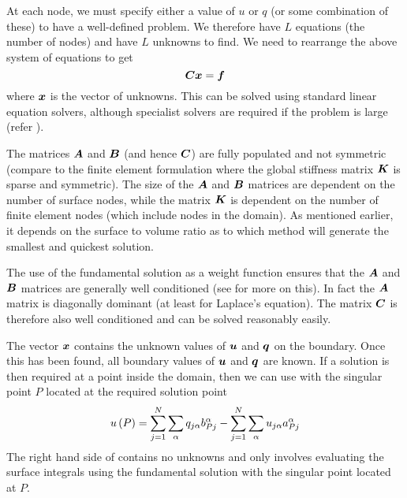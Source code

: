 At each node, we must specify either
a value of $u$ or $q$ (or some combination of these) to have a well-defined
problem.  We therefore have $L$ equations (the number of nodes) and have $L$
unknowns to find.  We need to rearrange the above system of equations to get
\begin{equation}
  \matr{C}\vectr{x} = \vectr{f}
  \label{eqn:ms2}
\end{equation}
where $\boldsymbol{x}$ is the vector of unknowns.  This can be solved using standard
linear equation solvers, although specialist solvers are required if the
problem is large (refer ).

The matrices $\matr{A}$ and $\matr{B}$ (and hence $\matr{C}$) are fully populated
and not symmetric (compare to the finite element formulation where the global
stiffness matrix $\matr{K}$ is sparse and symmetric).  The size of the $\matr{A}$
and $\matr{B}$ matrices are dependent on the number of surface nodes, while the
matrix $\matr{K}$ is dependent on the number of finite element nodes (which
include nodes in the domain). As mentioned earlier, it depends on the surface
to volume ratio as to which method will generate the smallest and quickest
solution.

The use of the fundamental solution as a weight function ensures that the
$\matr{A}$ and $\matr{B}$ matrices are generally well conditioned (see
 for more on this).  In fact the $\matr{A}$ matrix is
diagonally dominant (at least for Laplace's equation). The matrix $\matr{C}$ is
therefore also well conditioned and  can be solved reasonably
easily.

The vector $\boldsymbol{x}$ contains the unknown values of $\boldsymbol{u}$ and $\boldsymbol{q}$ on
the boundary.  Once this has been found, all boundary values of $\boldsymbol{u}$ and
$\boldsymbol{q}$ are known.  If a solution is then required at a point inside the
domain, then we can use  with the singular point $P$ located
at the required solution point \ie
\begin{equation}
   u\left( P \right)  =  \displaystyle\sum_{j=1}^{N}   \displaystyle\sum_{\alpha}^{}  q_{j\alpha}b_{Pj}^{\alpha}  - 
   \displaystyle\sum_{j=1}^{N}   \displaystyle\sum_{\alpha}^{}  u_{j\alpha}a_{Pj}^{\alpha}
  \label{eqn:rsp}
\end{equation}
The right hand side of  contains no unknowns and only involves
evaluating the surface integrals using the fundamental solution with the
singular point located at $P$.


